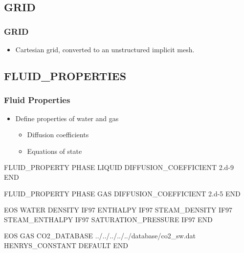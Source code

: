 \documentclass{beamer}
\begin{document}
\subsection{GRID}
\begin{frame}\frametitle{GRID}

\begin{itemize}
  \item Cartesian grid, converted to an unstructured implicit mesh.
\end{itemize}


\end{frame}
\subsection{FLUID\_PROPERTIES}
\begin{frame}\frametitle{Fluid Properties}

\begin{itemize}
  \item Define properties of water and gas
  \begin{itemize}
    \item Diffusion coefficients
    \item Equations of state
  \end{itemize}
\end{itemize}

\begin{semiverbatim}
FLUID_PROPERTY
  PHASE LIQUID
  DIFFUSION_COEFFICIENT 2.d-9
END

FLUID_PROPERTY
  PHASE GAS
  DIFFUSION_COEFFICIENT 2.d-5
END

\newpage

EOS WATER
  DENSITY IF97
  ENTHALPY IF97
  STEAM_DENSITY IF97
  STEAM_ENTHALPY IF97
  SATURATION_PRESSURE IF97
END

EOS GAS
  CO2_DATABASE ../../../../../database/co2_sw.dat
  HENRYS_CONSTANT DEFAULT
END

\end{semiverbatim}

\end{frame}
\end{document}
